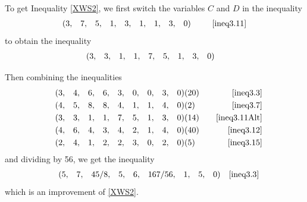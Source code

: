 \documentclass[10pt,journal]{IEEEtran}
\begin{document}
To get Inequality \eqref{XWS2}, we first switch the variables $C$ and $D$ in the inequality
\begin{align*}
&&(3&,&7&,&5&,&1&,&3&,&1&,&1&,&3&,&0)&&&&&\;\; \eqref{ineq3.11}
\end{align*}
to obtain the inequality
\begin{align}
&&(3&,&3&,&1&,&1&,&7&,&5&,&1&,&3&,&0)&&&&& \hspace{-10pt}\label{ineq3.11Alt}
\end{align}

Then combining the inequalities
\begin{align*}
&&(3&,&4&,&6&,&6&,&3&,&0&,&0&,&3&,&0)&(20)&&& \eqref{ineq3.3}\\
&&(4&,&5&,&8&,&8&,&4&,&1&,&1&,&4&,&0)&(2)&&& \eqref{ineq3.7}\\
&&(3&,&3&,&1&,&1&,&7&,&5&,&1&,&3&,&0)&(14)&&&  \eqref{ineq3.11Alt}\\
&&(4&,&6&,&4&,&3&,&4&,&2&,&1&,&4&,&0)&(40)&&& \eqref{ineq3.12}\\
&&(2&,&4&,&1&,&2&,&2&,&3&,&0&,&2&,&0)&(5)&&& \eqref{ineq3.15}
\end{align*}
and dividing by 56, we get the inequality
\begin{align*}
&&(5&,&7&,&45/8&,&5&,&6&,&167/56&,&1&,&5&,&0)&&&& \hspace{-10pt}\eqref{ineq3.3}
\end{align*}
which is an improvement of \eqref{XWS2}.
\end{document}
